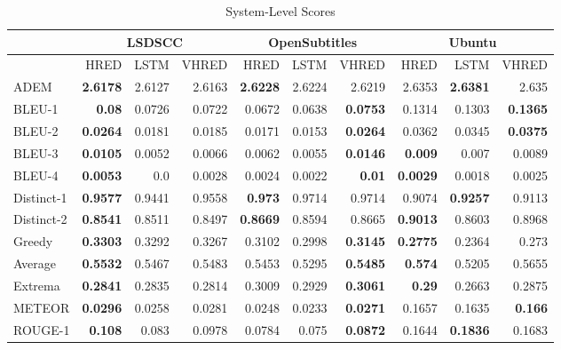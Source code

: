 \begin{table}[htb]
    \centering
    \caption{System-Level Scores}
    \small
    \label{tab:system_scores}
    \setlength{\tabcolsep}{0.09cm}
    \begin{tabular}{|l|r|r|r|r|r|r|r|r|r|}
        \hline
        & \multicolumn{3}{c|}{LSDSCC} & \multicolumn{3}{c|}{OpenSubtitles} & \multicolumn{3}{c|}{Ubuntu}\\
        \hline
        & HRED & LSTM & VHRED & HRED & LSTM & VHRED & HRED & LSTM & VHRED\\
        \hline
        ADEM & \textbf{2.6178} & 2.6127 & 2.6163 & \textbf{2.6228} & 2.6224 & 2.6219 & 2.6353 & \textbf{2.6381} & 2.635\\\hline
        BLEU{-}1 & \textbf{0.08} & 0.0726 & 0.0722 & 0.0672 & 0.0638 & \textbf{0.0753} & 0.1314 & 0.1303 & \textbf{0.1365}\\\hline
        BLEU{-}2 & \textbf{0.0264} & 0.0181 & 0.0185 & 0.0171 & 0.0153 & \textbf{0.0264} & 0.0362 & 0.0345 & \textbf{0.0375}\\\hline
        BLEU{-}3 & \textbf{0.0105} & 0.0052 & 0.0066 & 0.0062 & 0.0055 & \textbf{0.0146} & \textbf{0.009} & 0.007 & 0.0089\\\hline
        BLEU{-}4 & \textbf{0.0053} & 0.0 & 0.0028 & 0.0024 & 0.0022 & \textbf{0.01} & \textbf{0.0029} & 0.0018 & 0.0025\\\hline
        Distinct{-}1 & \textbf{0.9577} & 0.9441 & 0.9558 & \textbf{0.973} & 0.9714 & 0.9714 & 0.9074 & \textbf{0.9257} & 0.9113\\\hline
        Distinct{-}2 & \textbf{0.8541} & 0.8511 & 0.8497 & \textbf{0.8669} & 0.8594 & 0.8665 & \textbf{0.9013} & 0.8603 & 0.8968\\\hline
        Greedy & \textbf{0.3303} & 0.3292 & 0.3267 & 0.3102 & 0.2998 & \textbf{0.3145} & \textbf{0.2775} & 0.2364 & 0.273\\\hline
        Average & \textbf{0.5532} & 0.5467 & 0.5483 & 0.5453 & 0.5295 & \textbf{0.5485} & \textbf{0.574} & 0.5205 & 0.5655\\\hline
        Extrema & \textbf{0.2841} & 0.2835 & 0.2814 & 0.3009 & 0.2929 & \textbf{0.3061} & \textbf{0.29} & 0.2663 & 0.2875\\\hline
        METEOR & \textbf{0.0296} & 0.0258 & 0.0281 & 0.0248 & 0.0233 & \textbf{0.0271} & 0.1657 & 0.1635 & \textbf{0.166}\\\hline
        ROUGE{-}1 & \textbf{0.108} & 0.083 & 0.0978 & 0.0784 & 0.075 & \textbf{0.0872} & 0.1644 & \textbf{0.1836} & 0.1683\\\hline

\end{tabular}
\end{table}
